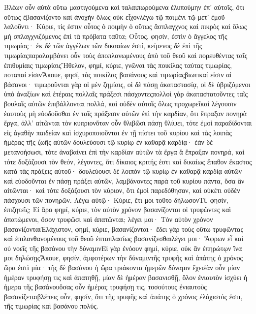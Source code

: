 Βλέων οὖν αὐτὰ οὕτω μαστιγούμενα καὶ ταλαιπωρούμενα ἐλυπούμην ἐπ’ αὐτοῖς, ὅτι οὕτως ἐβασανίζοντο καὶ ἀνοχὴν ὅλως οὐκ εἶχονλέγω τῷ ποιμένι τῷ μετ’ ἐμοῦ λαλοῦντι· Κύριε, τίς ἐστιν οὗτος ὁ ποιμὴν ὁ οὕτως ἄσπλαγχνος καὶ πικρὸς καὶ ὅλως μή σπλαγχνιζόμενος ἐπὶ τὰ πρόβατα ταῦτα; Οὗτος, φησίν, ἐστὶν ὁ ἄγγελος τῆς τιμωρίας· ἐκ δὲ τῶν ἀγγέλων τῶν δικααίων ἐστί, κείμενος δὲ ἐπὶ τῆς τιμωρίαςπαραλαμβάνει οὖν τοὺς ἀποπλανωμένους ἀπὸ τοῦ θεοῦ καὶ πορευθέντας ταῖς ἐπιθυμίαις τιμωρίαιςἬθελον, φημί, κύριε, γνῶναι τὰς ποικίλας ταύτας τιμωρίας, ποταπαί εἰσινἌκουε, φησί, τὰς ποικίλας βασάνους καὶ τιμωρίαςβιωτικαί εἰσιν αἱ βάσανοι· τιμωροῦνται γὰρ οἱ μὲν ζημίαις, οἱ δὲ πάσῃ ἀκαταστασίᾳ, οἱ δὲ ὑβριζόμενοι ὑπὸ ἀναξίων καὶ ἑτέραις πολλαῖς πράξεσι πάσχοντεςπολλοὶ γὰρ ἀκαταστατοῦντες ταῖς βουλαῖς αὐτῶν ἐπιβάλλονται πολλά, καὶ οὐδὲν αὐτοῖς ὅλως προχωρεῖκαὶ λέγουσιν ἑαυτοὺς μὴ εὐοδοῦσθαι ἐν ταῖς πράξεσιν αὐτῶν ἐπὶ τὴν καρδίαν, ὅτι ἔπραξαν πονηρὰ ἔργα, ἀλλ’ αἰτῶνται τὸν κυπριονὅταν οὖν θλιβῶσι πάσῃ θλίψει, τότε ἐμοὶ παραδίδονται εἰς ἀγαθὴν παιδείαν καὶ ἰσχυροποιοῦνται ἐν τῇ πίστει τοῦ κυρίου καὶ τὰς λοιπὰς ἡμέρας τῆς ζωῆς αὐτῶν δουλεύουσι τῷ κυρίῳ ἐν καθαρᾷ καρδίᾳ· ἐὰν δὲ μετανοήσωσι, τότε ἀναβαίνει ἐπὶ τὴν καρδίαν αὐτῶν τὰ ἔργα ἃ ἔπραξαν πονηρά, καὶ τότε δοξάζουσι τὸν θεόν, λέγοντες, ὅτι δίκαιος κριτής ἐστι καὶ δικαίως ἔπαθον ἕκαστος κατὰ τὰς πράξεις αὐτοῦ· δουλεύουσι δὲ λοιπὸν τῷ κυρίῳ ἐν καθαρᾷ καρδίᾳ αὐτῶν καὶ εὐοδοῦνται ἐν πάσῃ πράξει αὐτῶν, λαμβάνοντες παρὰ τοῦ κυρίου πάντα, ὅσα ἂν αἰτῶνται· καὶ τότε δοξάζουσι τὸν κύριον, ὅτι ἐμοὶ παρεδόθησαν, καὶ οὐκέτι οὐδὲν πάσχουσι τῶν πονηρῶν.
Λέγω αὐτῷ· Κύριε, ἔτι μοι τοῦτο δήλωσονΤί, φησίν, ἐπιζητεῖς; Εἰ ἄρα φημί, κύριε, τὸν αὐτὸν χρόνον βασανίζονται οἱ τρυφῶντες καὶ ἀπατώμενοι, ὅσον τρυφῶσι καὶ ἀπατῶνται; λέγει μοι· Τὸν αὐτὸν χρόνον βασανίζονταιἘλάχιστον, φημί, κύριε, βασανίζονται· ἔδει γὰρ τοὺς οὕτω τρυφῶντας καὶ ἐπιλανθανομένους τοῦ θεοῦ ἑπταπλασίως βασανίζεσθαιλέγει μοι· Ἄφρων εἶ καὶ οὐ νοεῖς τῆς βασάνου τὴν δύναμινΕἰ γὰρ ἐνόουν φημί, κύριε, οὐκ ἂν ἐπηρώτῳν ἵνα μοι δηλώσῃςἌκουε, φησίν, ἀμφοτέρων τὴν δύναμιντῆς τρυφῆς καὶ ἀπάτης ὁ χρόνος ὥρα ἐστὶ μία· τῆς δὲ βασάνου ἡ ὥρα τριάκοντα ἡμερῶν δύναμιν ἔχειἐὰν οὖν μίαν ἡμέραν τρυφήσῃ τις καὶ ἀπατηθῇ, μίαν δὲ ἡμέραν βασανισθῇ, ὅλον ἐνιαυτὸν ἰσχύει ἡ ἡμερα τῆς βασάνουὅσας οὖν ἡμέρας τρυφήσῃ τις, τοσούτους ἐνιαυτοὺς βασανίζεταιβλέπεις οὖν, φησίν, ὅτι τῆς τρυφῆς καὶ ἀπάτης ὁ χρόνος ἐλάχιστός ἐστι, τῆς τιμωρίας καὶ βασάνου πολύς.
